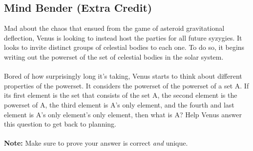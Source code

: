 \documentclass[12pt,letterpaper]{article}
\newcounter{enum22i}
\begin{document}
\subsection*{Mind Bender (Extra Credit)}
{
\nopagebreak 

{\setcounter{enum22i}{0}
Mad about the chaos that ensued from the game of asteroid gravitational deflection, Venus is looking to instead host the parties for all future syzygies. It looks to invite distinct groups of celestial bodies to each one. To do so, it begins writing out the powerset of the set of celestial bodies in the solar system.\\
\\
Bored of how surprisingly long it's taking, Venus starts to think about different properties of the powerset. It considers the powerset of the powerset of a set A. If its first element is the set that consists of the set A, the second element is the powerset of A, the third element is A’s only element, and the fourth and last element is A’s only element’s only element, then what is A? Help Venus answer this question to get back to planning.\\
\\
\textbf{Note: }Make sure to prove your answer is correct \emph{and} unique.

}
}
\end{document}
